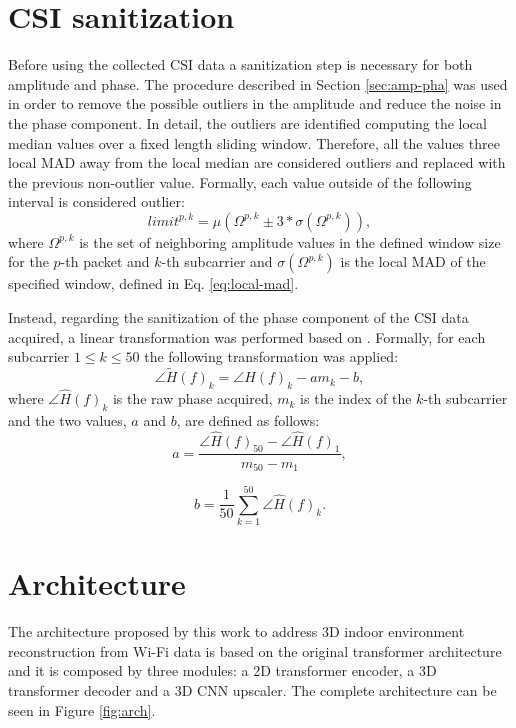 \documentclass[binding=0.6cm,noexaminfo]{sapthesis}
\begin{document}
\section{CSI sanitization}\label{sec:csi-san}

Before using the collected CSI data a sanitization step is necessary for both amplitude and phase. The procedure described in Section \ref{sec:amp-pha} was used in order to remove the possible outliers in the amplitude and reduce the noise in the phase component. In detail, the outliers are identified computing the local median values over a fixed length sliding window. Therefore, all the values three local MAD away from the local median are considered outliers and replaced with the previous non-outlier value.
Formally, each value outside of the following interval is considered outlier:
\begin{equation}
limit^{p, k} = \mu(\Omega^{p,k} \pm 3 * \sigma(\Omega^{p,k})),
\end{equation}
where $\Omega^{p, k}$ is the set of neighboring amplitude values in the defined window size for the $p$-th packet and $k$-th subcarrier and $\sigma(\Omega^{p,k})$ is the local MAD of the specified window, defined in Eq. \ref{eq:local-mad}.

Instead, regarding the sanitization of the phase component of the CSI data acquired, a linear transformation was performed based on \cite{pads, spot, phasefi}. Formally, for each subcarrier $1 \le k \le 50$ the following transformation was applied:
\begin{equation}
\angle \tilde{H}(f)_k = \angle \hat{H}(f)_k - a m_k - b,
\end{equation}
where $\angle \hat{H}(f)_k$ is the raw phase acquired, $m_k$ is the index of the $k$-th subcarrier and the two values, $a$ and $b$, are defined as follows:
\begin{equation}
a = \frac{\angle \hat{H}(f)_{50} - \angle \hat{H}(f)_1}{m_{50} - m_1},
\end{equation}

\begin{equation}
b = \frac{1}{50} \sum_{k=1}^{50} \angle \hat{H}(f)_k.
\end{equation}

\section{Architecture}\label{sec:arch}

The architecture proposed by this work to address 3D indoor environment reconstruction from Wi-Fi data is based on the original transformer architecture and it is composed by three modules: a 2D transformer encoder, a 3D transformer decoder and a 3D CNN upscaler. The complete architecture can be seen in Figure \ref{fig:arch}. 
\end{document}
